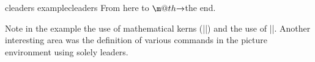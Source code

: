 \begin{texexample}{cleaders example}{cleaders}
 \makeatletter
 \def\rightarrowfill{$\m@th\smash-\mkern-7mu%
  \cleaders\hbox{$\mkern-2mu\smash-\mkern-2mu$}\hfill
  \mkern-7mu\mathord\rightarrow$}
 \makeatother
From here to \rightarrowfill the end.
\end{texexample}

Note in the example the use of mathematical kerns (|\mkern|) and the use of 
|\smash|. Another interesting area was the definition of various commands in the
picture environment using solely leaders.


















